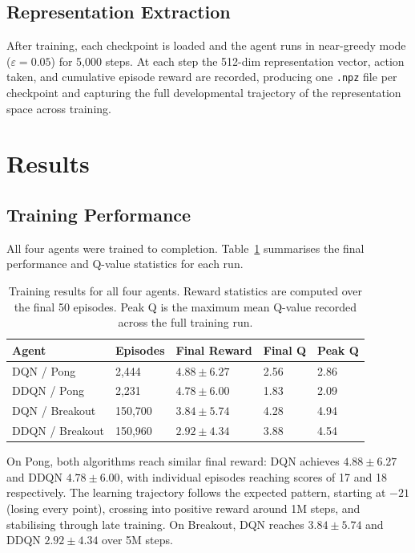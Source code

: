 \documentclass[a4paper]{article}
\begin{document}
\subsection{Representation Extraction}

After training, each checkpoint is loaded and the agent runs in near-greedy mode ($\varepsilon = 0.05$) for 5,000 steps. At each step the 512-dim representation vector, action taken, and cumulative episode reward are recorded, producing one \texttt{.npz} file per checkpoint and capturing the full developmental trajectory of the representation space across training.

\section{Results}
\label{sec:results}

\subsection{Training Performance}

All four agents were trained to completion. Table~\ref{tab:results} summarises the final performance and Q-value statistics for each run.

\begin{table}[H]
\centering
\caption{Training results for all four agents. Reward statistics are computed over the final 50 episodes. Peak Q is the maximum mean Q-value recorded across the full training run.}
\label{tab:results}
\begin{tabularx}{\linewidth}{lXXXX}
\toprule
\textbf{Agent} & \textbf{Episodes} & \textbf{Final Reward} & \textbf{Final Q} & \textbf{Peak Q} \\
\midrule
DQN / Pong      & 2,444   & $4.88 \pm 6.27$ & 2.56 & 2.86 \\
DDQN / Pong     & 2,231   & $4.78 \pm 6.00$ & 1.83 & 2.09 \\
DQN / Breakout  & 150,700 & $3.84 \pm 5.74$ & 4.28 & 4.94 \\
DDQN / Breakout & 150,960 & $2.92 \pm 4.34$ & 3.88 & 4.54 \\
\bottomrule
\end{tabularx}
\end{table}

On Pong, both algorithms reach similar final reward: DQN achieves $4.88 \pm 6.27$ and DDQN $4.78 \pm 6.00$, with individual episodes reaching scores of 17 and 18 respectively. The learning trajectory follows the expected pattern, starting at $-21$ (losing every point), crossing into positive reward around 1M steps, and stabilising through late training. On Breakout, DQN reaches $3.84 \pm 5.74$ and DDQN $2.92 \pm 4.34$ over 5M steps.
\end{document}
